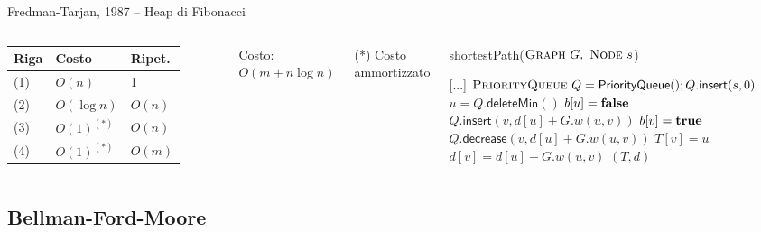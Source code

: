 \vspace{-9pt}
\begin{frame}{Fredman-Tarjan, 1987 -- Heap di Fibonacci}


\vspace{-9pt}

\begin{columns}

\begingroup
\renewcommand*{\arraystretch}{1.2}
\begin{tabular}{|l|l|l|}
\hline
Riga & Costo & Ripet. \\\hline
(1) & $O(n)$ & 1 \\\hline
(2) & $O(\log n)$ & $O(n)$ \\\hline
(3) & $O(1)^{(*)}$ & $O(n)$ \\\hline
(4) & $O(1)^{(*)}$ & $O(m)$ \\\hline
\end{tabular}
\endgroup

\medskip
Costo: \alert{$O(m + n \log n)$}

\medskip
(*) Costo ammortizzato

\vspace{-12pt}
\tiny
\begin{Procedure}
\caption[A]{\textsf{shortestPath}($\textsc{Graph}\ G,\ \textsc{Node}\ s$)}
[...]\;
\alert{$\textsc{PriorityQueue}\ Q = \textsf{PriorityQueue}(); Q.\textsf{insert}(s, 0)$}\;
{
  \alert{$u = Q.\textsf{deleteMin}()$}\;
  $b[u] = \FALSE$\;
  {
    {
      {
        \alert{$Q.\textsf{insert}(v, d[u]+G.w(u,v))$}\;
        $b[v] = \TRUE$\;
      }
      {
        \alert{$Q.\textsf{decrease}(v, d[u]+G.w(u,v))$}
      }
      $T[v] = u$\;
      $d[v] = d[u] + G.w(u,v)$\;
    }
  }
}
\Return $(T,d)$
\end{Procedure}
\end{columns}

\end{frame}

\subsection{Bellman-Ford-Moore}

